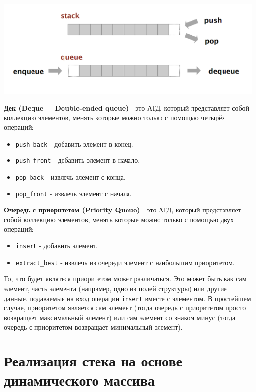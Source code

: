 \documentclass{article}
\begin{document}
\begin{center}
\includegraphics[scale=0.31]{../images/stack_queue.png}
\end{center}

\textbf{Дек (Deque = Double-ended queue)} - это АТД, который представляет собой коллекцию элементов, менять которые можно только с помощью четырёх операций:
\begin{itemize}
\item \texttt{push\_back} - добавить элемент в конец.
\item \texttt{push\_front} - добавить элемент в начало.
\item \texttt{pop\_back} - извлечь элемент с конца.
\item \texttt{pop\_front} - извлечь элемент с начала.\\
\end{itemize}

\textbf{Очередь с приоритетом (Priority Queue)} - это АТД, который представляет собой коллекцию элементов, менять которые можно только с помощью двух операций:
\begin{itemize}
\item \texttt{insert} - добавить элемент.
\item \texttt{extract\_best} - извлечь из очереди элемент с наибольшим приоритетом. 
\end{itemize}
То, что будет являться приоритетом может различаться. Это может быть как сам элемент, часть элемента (например, одно из полей структуры) или другие данные, подаваемые на вход операции \texttt{insert} вместе с элементом. В простейшем случае, приоритетом является сам элемент (тогда очередь с приоритетом просто возвращает максимальный элемент) или сам элемент со знаком минус (тогда очередь с приоритетом возвращает минимальный элемент).


\newpage
\section*{Реализация стека на основе динамического массива}
\end{document}
